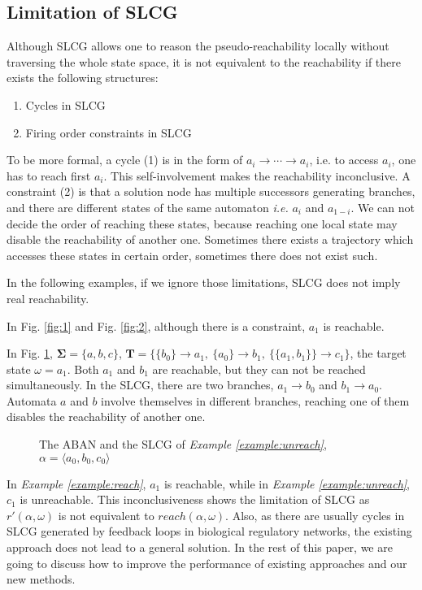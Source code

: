 \documentclass[runningheads]{llncs}
\newcommand{\acm}[3]{\{#1\}\rightarrow#3}
\begin{document}
\subsection{Limitation of SLCG}\label{limitation}
Although SLCG allows one to reason the pseudo-reachability locally without traversing the whole state space, it is not equivalent to the reachability if there exists the following structures:
\begin{enumerate}
\item Cycles in SLCG
\item Firing order constraints in SLCG

\end{enumerate}
To be more formal, a cycle (1) is in the form of $a_i\to\cdots\to a_i$, i.e. to access $a_i$, one has to reach first $a_i$. This self-involvement makes the reachability inconclusive. 
A constraint (2) is that a solution node has multiple successors generating branches, and there are different states of the same automaton \textit{i.e.} $a_i$ and $a_{1-i}$. 
We can not decide the order of reaching these states, because reaching one local state may disable the reachability of another one.
Sometimes there exists a trajectory which accesses these states in certain order, sometimes there does not exist such.

In the following examples, if we ignore those limitations, SLCG does not imply real reachability.


\begin{example}\label{example:reach}
In Fig. \ref{fig:1} and 
Fig. \ref{fig:2}, although there is a constraint, $a_1$ is reachable.
\end{example}

\begin{example}\label{example:unreach}
In Fig. \ref{fig:3}, $\mathbf{\Sigma}=\{a,b,c\}$, $\mathbf{T}=\{\acm{b_0}{a_0}{a_1},\ \acm{a_0}{b_0}{b_1},\ \acm{\{a_1,b_1\}}{c_0}{c_1}\}$, the target state $\omega=a_1$. 
Both $a_1$ and $b_1$ are reachable, but they can not be reached simultaneously.
In the SLCG, there are two branches, $a_1\to b_0$ and $b_1\to a_0$.
Automata $a$ and $b$ involve themselves in different branches, reaching one of them disables the reachability of another one.
\end{example}

\begin{figure}[ht]
\centering

\caption{The ABAN and the SLCG of \textit{Example \ref{example:unreach}}, $\alpha=\langle a_0,b_0,c_0\rangle$}
\label{fig:3}
\end{figure}
In \textit{Example \ref{example:reach}}, $a_1$ is reachable, while in \textit{Example \ref{example:unreach}}, $c_1$ is unreachable. This inconclusiveness shows the limitation of SLCG as $r'(\alpha,\omega)$ is not equivalent to $reach(\alpha,\omega)$.
Also, as there are usually cycles in SLCG generated by feedback loops in biological regulatory networks, the existing approach does not lead to a general solution.
In the rest of this paper, we are going to discuss how to improve the performance of existing approaches and our new methods. 
\end{document}

